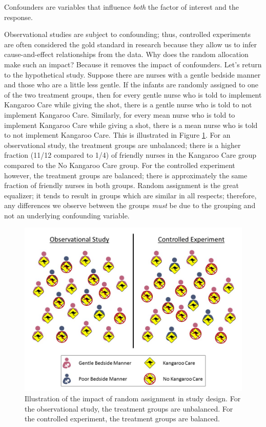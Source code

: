 \documentclass[]{book}
\theoremstyle{definition}
\theoremstyle{definition}
\theoremstyle{definition}
\theoremstyle{remark}
\let\BeginKnitrBlock\begin \let\EndKnitrBlock\end
\begin{document}
\BeginKnitrBlock{rmdtip}
Confounders are variables that influence \emph{both} the factor of
interest and the response.
\EndKnitrBlock{rmdtip}

Observational studies are subject to confounding; thus, controlled
experiments are often considered the gold standard in research because
they allow us to infer cause-and-effect relationships from the data. Why
does the random allocation make such an impact? Because it removes the
impact of confounders. Let's return to the hypothetical study. Suppose
there are nurses with a gentle bedside manner and those who are a little
less gentle. If the infants are randomly assigned to one of the two
treatment groups, then for every gentle nurse who is told to implement
Kangaroo Care while giving the shot, there is a gentle nurse who is told
to not implement Kangaroo Care. Similarly, for every mean nurse who is
told to implement Kangaroo Care while giving a shot, there is a mean
nurse who is told to not implement Kangaroo Care. This is illustrated in
Figure \ref{fig:data-randomization}. For an observational study, the
treatment groups are unbalanced; there is a higher fraction (11/12
compared to 1/4) of friendly nurses in the Kangaroo Care group compared
to the No Kangaroo Care group. For the controlled experiment however,
the treatment groups are balanced; there is approximately the same
fraction of friendly nurses in both groups. Random assignment is the
great equalizer; it tends to result in groups which are similar in all
respects; therefore, any differences we observe between the groups
\emph{must} be due to the grouping and not an underlying confounding
variable.

\begin{figure}

{\centering \includegraphics[width=0.8\linewidth]{./images/Data-Randomization} 

}

\caption{Illustration of the impact of random assignment in study design. For the observational study, the treatment groups are unbalanced.  For the controlled experiment, the treatment groups are balanced.}\label{fig:data-randomization}
\end{figure}
\end{document}
